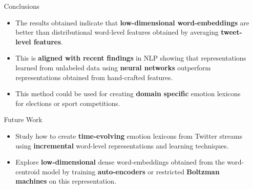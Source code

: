 \documentclass[handout]{beamer}
\begin{document}
\begin{frame}{Conclusions}
\begin{scriptsize}
\begin{itemize}
\item The results obtained indicate that \textbf{low-dimensional word-embeddings} are better than distributional word-level features obtained by averaging \textbf{tweet-level features}.  
\item This is \textbf{aligned with recent findings} in NLP showing that representations learned from unlabeled data using \textbf{neural networks} outperform representations obtained from hand-crafted features.
\item This method could be used for creating \textbf{domain specific} emotion lexicons for elections or sport competitions.
\end{itemize}
\end{scriptsize}
\end{frame}




\begin{frame}{Future Work}
\begin{scriptsize}
\begin{itemize}
\item Study how to create \textbf{time-evolving} emotion lexicons from Twitter streams using \textbf{incremental} word-level representations and learning techniques. 
\item Explore \textbf{low-dimensional} dense word-embeddings obtained from the word-centroid model by training \textbf{auto-encoders} or restricted \textbf{Boltzman machines} on this representation.
\end{itemize}
\end{scriptsize}
\end{frame}
\end{document}
